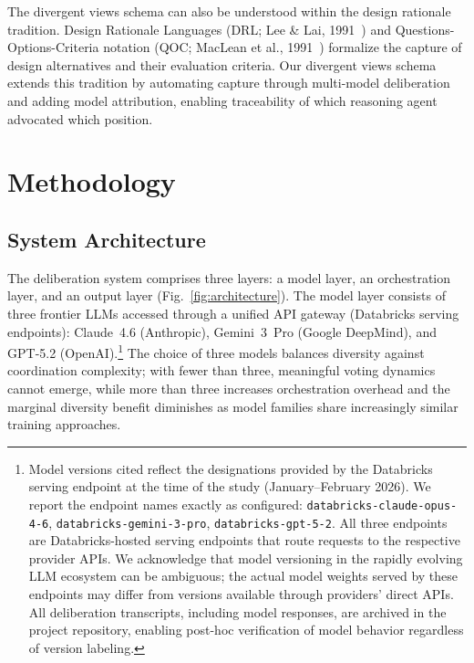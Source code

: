\documentclass[11pt,a4paper]{article}
\begin{document}
The divergent views schema can also be understood within the design rationale tradition. Design Rationale Languages (DRL; Lee \& Lai, 1991~\cite{lee1991drl}) and Questions-Options-Criteria notation (QOC; MacLean et al., 1991~\cite{maclean1991qoc}) formalize the capture of design alternatives and their evaluation criteria. Our divergent views schema extends this tradition by automating capture through multi-model deliberation and adding model attribution, enabling traceability of which reasoning agent advocated which position.

\section{Methodology}
\label{sec:methodology}

\subsection{System Architecture}
\label{sec:architecture}

The deliberation system comprises three layers: a model layer, an orchestration layer, and an output layer (Fig.~\ref{fig:architecture}). The model layer consists of three frontier LLMs accessed through a unified API gateway (Databricks serving endpoints): Claude~4.6 (Anthropic), Gemini~3~Pro (Google DeepMind), and GPT-5.2 (OpenAI).\footnote{Model versions cited reflect the designations provided by the Databricks serving endpoint at the time of the study (January--February 2026). We report the endpoint names exactly as configured: \texttt{databricks-claude-opus-4-6}, \texttt{databricks-gemini-3-pro}, \texttt{databricks-gpt-5-2}. All three endpoints are Databricks-hosted serving endpoints that route requests to the respective provider APIs. We acknowledge that model versioning in the rapidly evolving LLM ecosystem can be ambiguous; the actual model weights served by these endpoints may differ from versions available through providers' direct APIs. All deliberation transcripts, including model responses, are archived in the project repository, enabling post-hoc verification of model behavior regardless of version labeling.} The choice of three models balances diversity against coordination complexity; with fewer than three, meaningful voting dynamics cannot emerge, while more than three increases orchestration overhead and the marginal diversity benefit diminishes as model families share increasingly similar training approaches.
\end{document}

